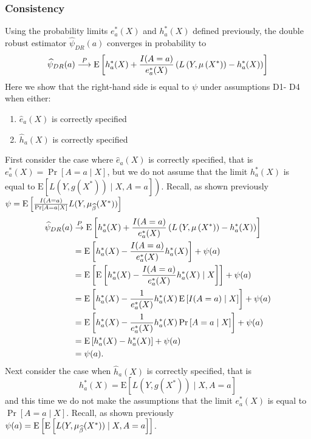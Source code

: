 \subsubsection{Consistency}
Using the probability limits $e_a^*(X)$ and $h_a^*(X)$ defined previously, the double robust estimator $\widehat{\psi}_{DR}(a)$ converges in probability to 
$$\widehat{\psi}_{DR}(a) \stackrel{P}{\longrightarrow} \operatorname{E}\left[h^*_a(X)+\frac{I(A = a)}{e^*_a(X)}\left(L\left(Y, \mu\left(X^*\right)\right)-h^*_a(X)\right)\right]$$
Here we show that the right-hand side is equal to $\psi$ under assumptions D1-
D4 when either:
\begin{enumerate}
    \item $\widehat{e}_a(X)$ is correctly specified
    \item $\widehat{h}_a(X)$ is correctly specified
\end{enumerate}
First consider the case where $\widehat{e}_a(X)$ is correctly specified, that is $e^*_a(X)=\operatorname{Pr}[A=a \mid X]$, but we do not assume that the limit $h^*_a(X)$ is equal to $\left.\mathrm{E}\left[L\left(Y, g\left(X^*\right)\right) \mid X, A=a\right]\right)$. Recall, as shown previously $\psi = \operatorname{E}\left[\frac{I(A = a)}{\Pr[A = a \mid X]}L(Y, \mu_{\widehat{\beta}}(X^*))\right] $
$$
\begin{aligned}
\widehat{\psi}_{DR}(a) & \stackrel{P}{\rightarrow}  \operatorname{E}\left[h^*_a(X)+\frac{I(A = a)}{e^*_a(X)}\left(L\left(Y, \mu\left(X^*\right)\right)-h^*_a(X)\right)\right] \\
& =\operatorname{E}\left[h^*_a(X)-\frac{I(A = a)}{e^*_a(X)}h^*_a(X)\right]+\psi(a) \\
& =\operatorname{E}\left[\operatorname{E}\left[h^*_a(X)-\frac{I(A = a)}{e^*_a(X)}h^*_a(X) \mid X \right]\right]+\psi(a) \\
& =\operatorname{E}\left[h^*_a(X)-\frac{1}{e^*_a(X)}h^*_a(X) \operatorname{E}\left[I(A = a) \mid X \right]\right]+\psi(a) \\
& =\operatorname{E}\left[h^*_a(X)-\frac{1}{e^*_a(X)}h^*_a(X) \Pr\left[A = a \mid X \right]\right]+\psi(a) \\
& =\operatorname{E}\left[h^*_a(X)-h^*_a(X)\right]+\psi(a) \\
& =\psi(a) .
\end{aligned}
$$
Next consider the case when $\widehat{h}_a(X)$ is correctly specified, that is
$$
h^*_a(X)=\mathrm{E}\left[L\left(Y, g\left(X^*\right)\right) \mid X, A=a\right]
$$
and this time we do not make the assumptions that the limit $e^*_a(X)$ is equal to $\operatorname{Pr}[A=a \mid X]$. Recall, as shown previously $\psi(a) = \operatorname{E}\left[\operatorname{E}\left[L(Y, \mu_{\widehat{\beta}}(X^*))\mid X, A = a\right]\right] $. 

